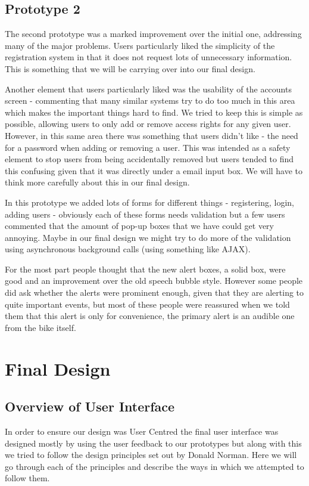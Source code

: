 \documentclass[a4paper]{report}
\begin{document}
{\section{Prototype 2}
The second prototype was a marked improvement over the initial one, addressing many of the major problems. Users particularly liked the simplicity of the registration system in that it does not request lots of unnecessary information. This is something that we will be carrying over into our final design. 

Another element that users particularly liked was the usability of the accounts screen - commenting that many similar systems try to do too much in this area which makes the important things hard to find. We tried to keep this is simple as possible, allowing users to only add or remove access rights for any given user. However, in this same area there was something that users didn't like - the need for a password when adding or removing a user. This was intended as a safety element to stop users from being accidentally removed but users tended to find this confusing given that it was directly under a email input box. We will have to think more carefully about this in our final design.  

In this prototype we added lots of forms for different things - registering, login, adding users - obviously each of these forms needs validation but a few users commented that the amount of pop-up boxes that we have could get very annoying. Maybe in our final design we might try to do more of the validation using asynchronous background calls (using something like AJAX).

For the most part people thought that the new alert boxes, a solid box, were good  and an improvement over the old speech bubble style. However some people did ask whether the alerts were prominent enough, given that they are alerting to quite important events, but most of these people were reassured when we told them that this alert is only for convenience, the primary alert is an audible one from the bike itself.
\chapter{Final Design}
\section{Overview of User Interface}
In order to ensure our design was User Centred the final user interface was designed mostly by using the user feedback to our prototypes but along with this we tried to follow the design principles set out by Donald Norman\cite{don_norman}. Here we will go through each of the principles and describe the ways in which we attempted to follow them.
}
\end{document}
